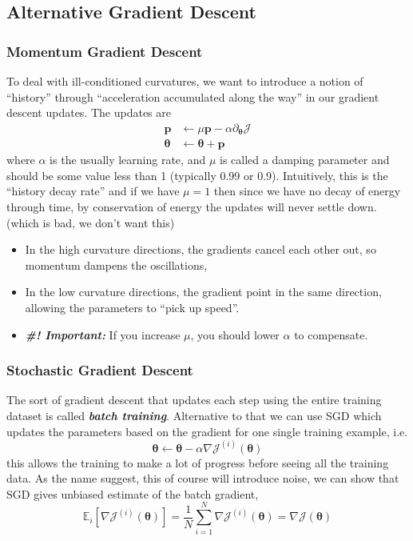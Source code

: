 \documentclass[11pt]{article}
\newcommand{\bp}{\mathbf{p}}
\begin{document}
\subsection{Alternative Gradient Descent}
\subsubsection{Momentum Gradient Descent}
To deal with ill-conditioned curvatures, we want to introduce a notion of ``history'' through ``acceleration accumulated along the way'' in our gradient descent updates. The updates are
\begin{align}
    \mathbf{p} &\gets \mu\mathbf{p} - \alpha \partial_{\boldsymbol{\theta}} \mathcal{J} \\
    \boldsymbol{\theta} &\gets \boldsymbol{\theta} + \bp
\end{align}
where $\alpha$ is the usually learning rate, and $\mu$ is called a damping parameter and should be some value less than 1 (typically 0.99 or 0.9). Intuitively, this is the ``history decay rate'' and if we have $\mu = 1$ then since we have no decay of energy through time, by conservation of energy the updates will never settle down. (which is bad, we don't want this)
\begin{itemize}
    \item In the high curvature directions, the gradients cancel each other out, so momentum dampens the oscillations, 
    \item In the low curvature directions, the gradient point in the same direction, allowing the parameters to ``pick up speed''.
    \item \textit{\textbf{\#! Important:}} If you increase $\mu$, you should lower $\alpha$ to compensate.
\end{itemize}

\subsubsection{Stochastic Gradient Descent}
The sort of gradient descent that updates each step using the entire training dataset is called \textit{\textbf{batch training}}. Alternative to that we can use SGD which updates the parameters based on the gradient for one single training example, i.e.
\begin{equation}
    \boldsymbol{\theta} \leftarrow \boldsymbol{\theta}-\alpha \nabla \mathcal{J}^{(i)}(\boldsymbol{\theta})
\end{equation}
this allows the training to make a lot of progress before seeing all the training data. As the name suggest, this of course will introduce noise, we can show that SGD gives unbiased estimate of the batch gradient, 
\begin{equation}
    \mathbb{E}_{i}\left[\nabla \mathcal{J}^{(i)}(\boldsymbol{\theta})\right]=\frac{1}{N} \sum_{i=1}^{N} \nabla \mathcal{J}^{(i)}(\boldsymbol{\theta})=\nabla \mathcal{J}(\boldsymbol{\theta})
\end{equation}
\end{document}

